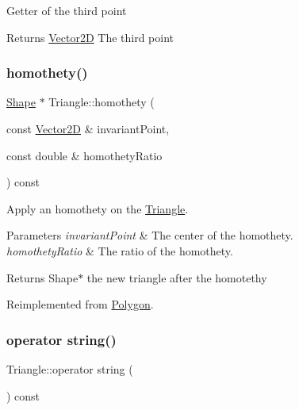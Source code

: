 Getter of the third point \begin{DoxyReturn}{Returns}
\hyperlink{class_vector2_d}{Vector2D} The third point 
\end{DoxyReturn}
\hypertarget{class_triangle_a45a3a9f74118c99b95c6d8e993773a71}{}\label{class_triangle_a45a3a9f74118c99b95c6d8e993773a71} 
\subsubsection{\texorpdfstring{homothety()}{homothety()}}
{\footnotesize\ttfamily \hyperlink{class_shape}{Shape} $\ast$ Triangle\+::homothety (\begin{DoxyParamCaption}\item[{const \hyperlink{class_vector2_d}{Vector2D} \&}]{invariant\+Point,  }\item[{const double \&}]{homothety\+Ratio }\end{DoxyParamCaption}) const\hspace{0.3cm}{\ttfamily [virtual]}}

Apply an homothety on the \hyperlink{class_triangle}{Triangle}. 
\begin{DoxyParams}{Parameters}
{\em invariant\+Point} & The center of the homothety. \\
\hline
{\em homothety\+Ratio} & The ratio of the homothety. \\
\hline
\end{DoxyParams}
\begin{DoxyReturn}{Returns}
Shape$\ast$ the new triangle after the homotethy 
\end{DoxyReturn}


Reimplemented from \hyperlink{class_polygon_a2b77c7ecbe9ca68664d7f7020181b791}{Polygon}.

\hypertarget{class_triangle_acd8612cc20ffb71e543944c869e4ab81}{}\label{class_triangle_acd8612cc20ffb71e543944c869e4ab81} 
\subsubsection{\texorpdfstring{operator string()}{operator string()}}
{\footnotesize\ttfamily Triangle\+::operator string (\begin{DoxyParamCaption}{ }\end{DoxyParamCaption}) const\hspace{0.3cm}{\ttfamily [virtual]}}

